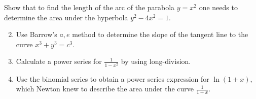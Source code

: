\begin{exercises}{}{}
\exstart%
  Show that to find the length of the arc of the parabola $y=x^2$ one needs to determine the area under the hyperbola $y^2-4x^2=1$.
\begin{enumerate}\setcounter{enumi}{1}
	\item%
	Use Barrow's $a,e$ method to determine the slope of the tangent line to the curve $x^3+y^3=c^3$.
	
	\item%
	Calculate a power series for $\frac 1{1-x^2}$ by using long-division.
	
	\item Use the binomial series to obtain a power series expression for $\ln(1+x)$, which Newton knew to describe the area under the curve $\frac 1{1+x}$. 


\end{enumerate}
\end{exercises}
